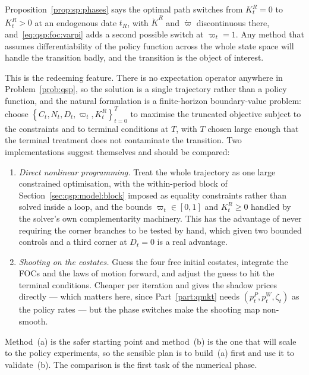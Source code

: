 Proposition~\ref{prop:sp:phases} says the
optimal path switches from $K^R_t=0$ to $K^R_t>0$ at an endogenous date $t_R$, with $\dot K^R$ and
$\dot\varpi$ discontinuous there, and~\eqref{eq:qsp:foc:varpi} adds a second possible switch at
$\varpi_t=1$. Any method that assumes differentiability of the policy function across the whole state
space will handle the transition badly, and the transition is the object of interest.

 This is the redeeming
feature. There is no expectation operator anywhere in Problem~\ref{prob:qsp}, so the solution is a
single trajectory rather than a policy function, and the natural formulation is a finite-horizon
boundary-value problem: choose $\left\{C_t,N_t,D_t,\varpi_t,K^R_t\right\}_{t=0}^{T}$ to maximise the
truncated objective subject to the constraints and to terminal conditions at $T$, with $T$ chosen large
enough that the terminal treatment does not contaminate the transition. Two implementations suggest
themselves and should be compared:
\begin{enumerate}[label=\emph{(\alph*)},leftmargin=2.2em,itemsep=0.15em]
\item \emph{Direct nonlinear programming.} Treat the whole trajectory as one large constrained
optimisation, with the within-period block of Section~\ref{sec:qsp:model:block} imposed as equality
constraints rather than solved inside a loop, and the bounds $\varpi_t\in\left[0,1\right]$ and
$K^R_t\ge0$ handled by the solver's own complementarity machinery. This has the advantage of never
requiring the corner branches to be tested by hand, which given two bounded controls and a third corner
at $D_t=0$ is a real advantage.
\item \emph{Shooting on the costates.} Guess the four free initial costates, integrate the FOCs and the
laws of motion forward, and adjust the guess to hit the terminal conditions. Cheaper per iteration and
gives the shadow prices directly --- which matters here, since Part~\ref{part:qmkt} needs
$\left(p^P_t,p^W_t,\zeta_t\right)$ as the policy rates --- but the phase switches make the shooting map
non-smooth.
\end{enumerate}
Method~(a) is the safer starting point and method~(b) is the one that will scale to the policy
experiments, so the sensible plan is to build~(a) first and use it to validate~(b). The comparison is
the first task of the numerical phase.

